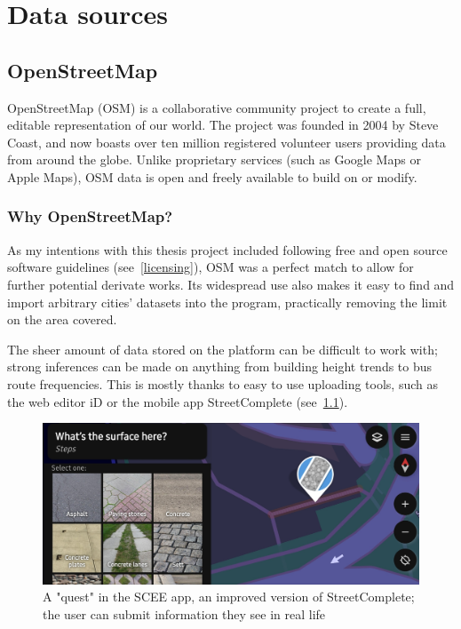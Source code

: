 \chapter{Data sources} %

\section{OpenStreetMap}

OpenStreetMap (OSM) is a collaborative community project to create a full, editable representation of our world. The project was founded in 2004 by Steve Coast, and now boasts over ten million registered volunteer users providing data from around the globe. Unlike proprietary services (such as Google Maps or Apple Maps), OSM data is open and freely available to build on or modify.\cite{osmHistory}

\subsection{Why OpenStreetMap?}

As my intentions with this thesis project included following free and open source software guidelines (see~\ref{licensing}), OSM was a perfect match to allow for further potential derivate works. Its widespread use also makes it easy to find and import arbitrary cities' datasets into the program, practically removing the limit on the area covered.

The sheer amount of data stored on the platform can be difficult to work with; strong inferences can be made on anything from building height trends to bus route frequencies. This is mostly thanks to easy to use uploading tools, such as the web editor iD or the mobile app StreetComplete (see~\ref{scee}).

\begin{figure}[h]
    \centering
    \includegraphics[width=140mm, keepaspectratio]{images/scee_example.jpg}
    \caption{A "quest" in the SCEE app, an improved version of StreetComplete; the user can submit information they see in real life \label{scee}}
\end{figure}


